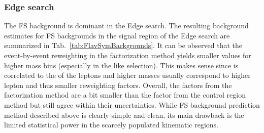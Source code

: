 \subsubsection*{Edge search}
\noindent\justify
The FS background is dominant in the Edge search.
The resulting background estimates for FS backgrounds in the signal region of the Edge search are summarized in Tab.~\ref{tab:FlavSymBackgrounds}.
It can be observed that the event-by-event reweighting in the factorization method yields smaller \Rsfof values for higher mass bins (especially in the \ttbar like selection).
This makes sense since \mll is correlated to the \pt of the leptons and higher masses usually correspond to higher lepton \pt and thus smaller reweighting factors.
Overall, the \Rsfof factors from the factorization method are a bit smaller than the factor from the control region method but still agree within their uncertainties.
While FS background prediction method described above is clearly simple and clean, its main drawback is the limited statistical power in the scarcely populated kinematic regions.
